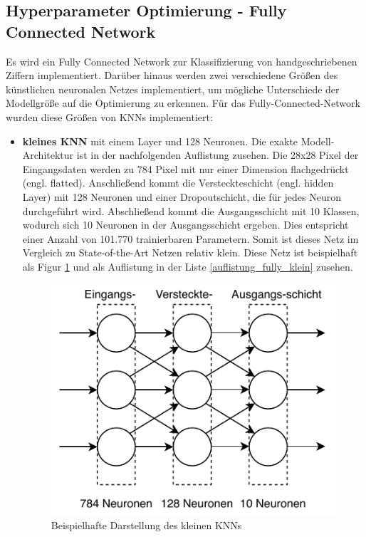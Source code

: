 \subsection{Hyperparameter Optimierung - Fully Connected Network}
Es wird ein Fully Connected Network zur Klassifizierung von handgeschriebenen Ziffern implementiert. Darüber hinaus werden zwei verschiedene Größen des künstlichen neuronalen Netzes implementiert, um mögliche Unterschiede der Modellgröße auf die Optimierung zu erkennen. Für das Fully-Connected-Network wurden diese Größen von KNNs implementiert:
\begin{itemize}
\item \textbf{kleines KNN} mit einem Layer und 128 Neuronen. Die exakte Modell-Architektur ist in der nachfolgenden Auflistung zusehen. Die 28x28 Pixel der Eingangsdaten werden zu 784 Pixel mit nur einer Dimension flachgedrückt (engl. flatted). Anschließend kommt die Versteckteschicht (engl. hidden Layer) mit 128 Neuronen und einer  Dropoutschicht, die für jedes Neuron durchgeführt wird. Abschließend kommt die Ausgangsschicht mit 10 Klassen, wodurch sich 10 Neuronen in der Ausgangsschicht ergeben. Dies entspricht einer Anzahl von 101.770 trainierbaren Parametern. Somit ist dieses Netz im Vergleich zu State-of-the-Art Netzen relativ klein. Diese Netz ist beispielhaft als Figur \ref{fig:mlp_128} und als Auflistung in der Liste \ref{auflistung_fully_klein} zusehen.

\noindent%
\begin{figure}[H]
  \centering  
  \includegraphics[scale=0.9]{img/mlp_128.pdf}
  \caption{Beispielhafte Darstellung des kleinen KNNs}
  \label{fig:mlp_128}
\end{figure}



\end{itemize}
